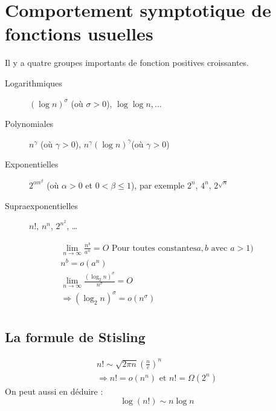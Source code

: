 \section{Comportement symptotique de fonctions usuelles}
Il y a quatre groupes importants de fonction positives croissantes.
\begin{description}
	\item[Logarithmiques] $(\log n)^\sigma$ (où $\sigma > 0$), $\log\log n, \ldots$
	\item[Polynomiales] $n^\gamma$ (où $\gamma > 0$), $n^\gamma(\log n)^\gamma$(où $\gamma > 0$)
	\item[Exponentielles] $2^{\alpha n^\beta}$ (où $\alpha > 0$ et $0 < \beta \leq 1$), par exemple $2^n$, $4^n$, $2^{\sqrt{n}}$
	\item[Supraexponentielles] $n!$, $n^n$, $2^{n^2}$, \ldots
\end{description}

\begin{eqnarray*}
	\lim_{n\rightarrow \infty} \frac{n^b}{a^n} = O \textrm{ Pour toutes constantes} a,b \textrm{ avec } a > 1 \textrm{)}\\
	n^b = o(a^n)\\
	\lim_{n\rightarrow \infty} \frac{(\log_2 n)^{\sigma}}{n^\sigma} = O\\
	\Rightarrow (\log_2 n)^\sigma = o(n^\sigma)\\
\end{eqnarray*}


\subsection{La formule de Stisling}
\begin{eqnarray*}
	n! \sim \sqrt{2\pi n}(\frac{n}{e})^n\\
	\Rightarrow n! = o(n^n) \textrm{ et } n! = \Omega(2^n)
\end{eqnarray*}
On peut aussi en déduire :
$$\log(n!) \sim n\log n$$

